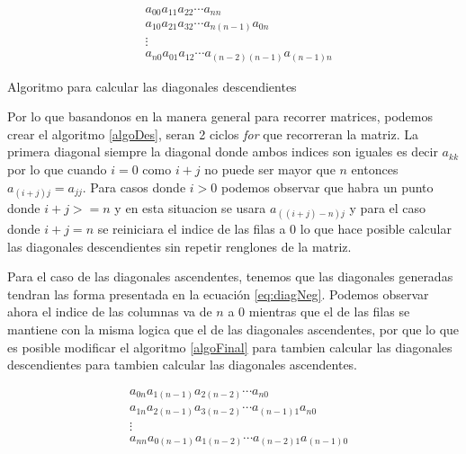 \documentclass[10pt]{IEEEtran}
\begin{document}
\begin{equation}
  \label{eq:diagPos}
  \begin{aligned}
    &a_{00}a_{11}a_{22}\cdots a_{nn}\\
    &a_{10}a_{21}a_{32}\cdots a_{n(n-1)}a_{0n}\\
    &\vdots \\
    &a_{n0}a_{01}a_{12}\cdots a_{(n-2)(n-1)}a_{(n-1)n}
  \end{aligned}
\end{equation}

\begin{algorithm}
  \label{algoDes}
  \SetAlgoLined
  \caption{Algoritmo para calcular las diagonales descendientes}
\end{algorithm}

Por lo que basandonos en la manera general para recorrer matrices, podemos crear el algoritmo \ref{algoDes}, seran 2 ciclos \textit{for} que recorreran la matriz. La primera diagonal siempre la diagonal donde ambos indices son iguales es decir $a_{kk}$ por lo que cuando $i = 0$ como $i + j$ no puede ser mayor que $n$ entonces $a_{(i+j)j} = a_{jj}$. Para casos donde $i > 0$ podemos observar que habra un punto donde $i + j >= n$ y en esta situacion se usara $a_{((i+j)-n)j}$ y para el caso donde $i + j = n$ se reiniciara el indice de las filas a $0$ lo que hace posible calcular las diagonales descendientes sin repetir renglones de la matriz.

Para el caso de las diagonales ascendentes, tenemos que las diagonales generadas tendran las forma presentada en la ecuación \ref{eq:diagNeg}. Podemos observar ahora el indice de las columnas va de $n$ a $0$ mientras que el de las filas se mantiene con la misma logica que el de las diagonales ascendentes, por que lo que es posible modificar el algoritmo \ref{algoFinal} para tambien calcular las diagonales descendientes para tambien calcular las diagonales ascendentes.

\begin{equation}
  \label{eq:diagNeg}
  \begin{aligned}
    &a_{0n}a_{1(n-1)}a_{2(n-2)}\cdots a_{n0}\\
    &a_{1n}a_{2(n-1)}a_{3(n-2)}\cdots a_{(n-1)1}a_{n0}\\
    &\vdots \\
    &a_{nn}a_{0(n-1)}a_{1(n-2)}\cdots a_{(n-2)1}a_{(n-1)0}
  \end{aligned}
\end{equation}
\end{document}
